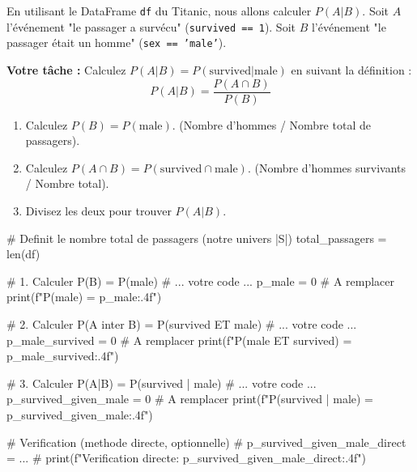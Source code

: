 \begin{exercicebox}
En utilisant le DataFrame \texttt{df} du Titanic, nous allons calculer $P(A|B)$.
Soit $A$ l'événement "le passager a survécu" (\texttt{survived == 1}).
Soit $B$ l'événement "le passager était un homme" (\texttt{sex == 'male'}).

\textbf{Votre tâche :}
Calculez $P(A|B) = P(\text{survived} | \text{male})$ en suivant la définition :
$$P(A|B) = \frac{P(A \cap B)}{P(B)}$$
\begin{enumerate}
    \item Calculez $P(B) = P(\text{male})$. (Nombre d'hommes / Nombre total de passagers).
    \item Calculez $P(A \cap B) = P(\text{survived} \cap \text{male})$. (Nombre d'hommes survivants / Nombre total).
    \item Divisez les deux pour trouver $P(A|B)$.
\end{enumerate}

\begin{codecell}
# Definit le nombre total de passagers (notre univers |S|)
total_passagers = len(df)

# 1. Calculer P(B) = P(male)
# ... votre code ...
p_male = 0 # A remplacer
print(f"P(male) = {p_male:.4f}")

# 2. Calculer P(A inter B) = P(survived ET male)
# ... votre code ...
p_male_survived = 0 # A remplacer
print(f"P(male ET survived) = {p_male_survived:.4f}")

# 3. Calculer P(A|B) = P(survived | male)
# ... votre code ...
p_survived_given_male = 0 # A remplacer
print(f"P(survived | male) = {p_survived_given_male:.4f}")

# Verification (methode directe, optionnelle)
# p_survived_given_male_direct = ...
# print(f"Verification directe: {p_survived_given_male_direct:.4f}")
\end{codecell}
\end{exercicebox}



